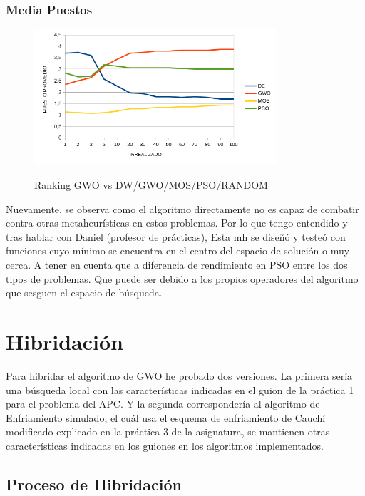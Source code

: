 \documentclass[a4paper, 12.5pt]{report}
\begin{document}
\subsubsection*{Media Puestos}

\begin{figure}[H]
    \caption{Ranking GWO vs DW/GWO/MOS/PSO/RANDOM}
    \centering
    \includegraphics[width=0.8\textwidth]{Resultados/basico/d30/Grafico_puestos.png} \label{img:ranking_D30}
\end{figure}
Nuevamente, se observa como el algoritmo directamente no es capaz de combatir contra otras metaheurísticas en estos problemas. Por lo que tengo entendido y tras hablar con Daniel (profesor de prácticas), Esta mh se diseñó y testeó con funciones cuyo mínimo se encuentra en el centro del espacio de solución o muy cerca. A tener en cuenta que a diferencia de rendimiento en PSO entre los dos tipos de problemas. Que puede ser debido a los propios operadores del algoritmo que sesguen el espacio de búsqueda.



\section{Hibridación }

Para hibridar el algoritmo de GWO he probado dos versiones. La primera sería una búsqueda local con las características indicadas en el guion de la práctica 1 para el problema del APC. Y la segunda correspondería al algoritmo de Enfriamiento simulado, el cuál usa el esquema de enfriamiento de Cauchí modificado explicado en la práctica 3 de la asignatura, se mantienen otras características indicadas en los guiones en los algoritmos implementados.



\subsection{Proceso de Hibridación}
\end{document}

